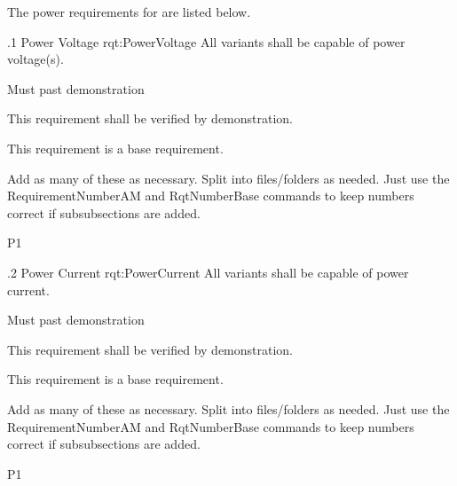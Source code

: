 The power requirements for \ThisSystem are listed below.

\ONERQMTVKPP
{\RqtNumberBase.1}
{Power Voltage}
{rqt:PowerVoltage}
{All \ThisSys variants shall be capable of \TBD power voltage(s).}
{
	\item [Phase 1] Must past demonstration
}
{This requirement shall be verified by demonstration.}
{
	\item [N/A] This requirement is a base requirement.
}
{
  \item Add as many of these as necessary.  Split into files/folders as needed. Just use the RequirementNumberAM and RqtNumberBase commands to keep numbers correct if subsubsections are added.
}
{P1}

\ONERQMTVKPP
{\RqtNumberBase.2}
{Power Current}
{rqt:PowerCurrent}
{All \ThisSys variants shall be capable of \TBD power current.}
{
	\item [Phase 1] Must past demonstration
}
{This requirement shall be verified by demonstration.}
{
	\item [N/A] This requirement is a base requirement.
}
{
  \item Add as many of these as necessary.  Split into files/folders as needed. Just use the RequirementNumberAM and RqtNumberBase commands to keep numbers correct if subsubsections are added.
}
{P1}
